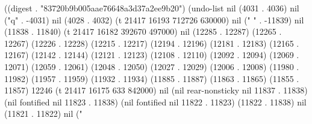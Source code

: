 
((digest . "83720b9b005aae76648a3d37a2ee9b20") (undo-list nil (4031 . 4036) nil ("q" . -4031) nil (4028 . 4032) (t 21417 16193 712726 630000) nil (" " . -11839) nil (11838 . 11840) (t 21417 16182 392670 497000) nil (12285 . 12287) (12265 . 12267) (12226 . 12228) (12215 . 12217) (12194 . 12196) (12181 . 12183) (12165 . 12167) (12142 . 12144) (12121 . 12123) (12108 . 12110) (12092 . 12094) (12069 . 12071) (12059 . 12061) (12048 . 12050) (12027 . 12029) (12006 . 12008) (11980 . 11982) (11957 . 11959) (11932 . 11934) (11885 . 11887) (11863 . 11865) (11855 . 11857) 12246 (t 21417 16175 633 842000) nil (nil rear-nonsticky nil 11837 . 11838) (nil fontified nil 11823 . 11838) (nil fontified nil 11822 . 11823) (11822 . 11838) nil (11821 . 11822) nil ("%